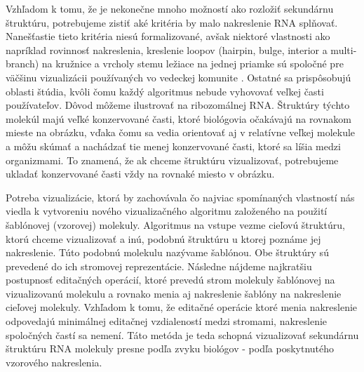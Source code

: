 Vzhľadom k tomu, že je nekonečne mnoho možností ako rozložiť sekundárnu štruktúru,
potrebujeme zistiť aké kritéria by malo nakreslenie RNA splňovať. Nanešťastie
tieto kritéria niesú formalizované, avšak niektoré vlastnosti ako napríklad
rovinnosť nakreslenia, kreslenie loopov (hairpin, bulge, interior a multi-branch)
na kružnice a vrcholy stemu ležiace na jednej priamke sú spoločné pre väčšinu
vizualizácii používaných vo vedeckej komunite .
Ostatné sa prispôsobujú oblasti štúdia, kvôli čomu každý algoritmus nebude
vyhovovať veľkej časti používateľov.
Dôvod môžeme ilustrovať na ribozomálnej RNA. Štruktúry týchto molekúl
majú veľké konzervované časti, ktoré biológovia očakávajú na rovnakom mieste
na obrázku, vďaka čomu sa vedia orientovať aj v relatívne veľkej molekule
a môžu skúmať a nachádzať tie menej konzervované časti, ktoré sa líšia medzi organizmami.
To znamená, že ak chceme štruktúru vizualizovať, potrebujeme ukladať
konzervované časti vždy na rovnaké miesto v obrázku.

Potreba vizualizácie, ktorá by zachovávala čo najviac spomínaných vlastností
nás viedla k vytvoreniu nového vizualizačného algoritmu  založeného
na použití šablónovej (vzorovej) molekuly. Algoritmus na vstupe vezme cieľovú
štruktúru, ktorú chceme vizualizovať a inú, podobnú štruktúru u ktorej poznáme jej
nakreslenie. Túto podobnú molekulu nazývame šablónou. Obe štruktúry sú
prevedené do ich stromovej reprezentácie. Následne nájdeme najkratšiu postupnosť
editačných operácií, ktoré prevedú strom molekuly šablónovej na vizualizovanú
molekulu a rovnako menia aj nakreslenie šablóny na nakreslenie cieľovej molekuly.
Vzhľadom k tomu, že editačné operácie ktoré menia nakreslenie odpovedajú
minimálnej editačnej vzdialeností medzi stromami, nakreslenie spoločných častí sa nemení.
Táto metóda je teda schopná vizualizovať sekundárnu štruktúru RNA
molekuly presne podľa zvyku biológov - podľa poskytnutého vzorového nakreslenia.


